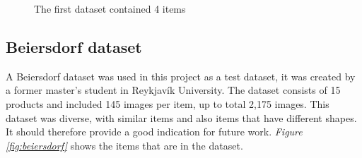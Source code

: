 \begin{figure}[h]
    \centering
    \hfill
    \hfill
    \hfill
    \caption{The first dataset contained 4 items}
    \label{figure: products}
\end{figure}

\subsection{Beiersdorf dataset}\label{sec:beiersdorfdataset}
A Beiersdorf dataset\cite{bjarnason_1984-_detecting_2021} was used in this project as a test dataset, it was created by a former master's student in Reykjavík University. 
The dataset consists of 15 products and included 145 images per item, up to total 2,175 images. This dataset was diverse, with similar items and also items that have different shapes. It should therefore provide a good indication for future work. \textit{Figure \ref{fig:beiersdorf}} shows the items that are in the dataset.

